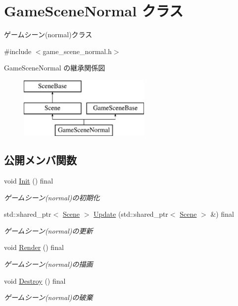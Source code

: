 \hypertarget{class_game_scene_normal}{}\section{Game\+Scene\+Normal クラス}
\label{class_game_scene_normal}


ゲームシーン(normal)クラス  




{\ttfamily \#include $<$game\+\_\+scene\+\_\+normal.\+h$>$}

Game\+Scene\+Normal の継承関係図\begin{figure}[H]
\begin{center}
\leavevmode
\includegraphics[height=3.000000cm]{class_game_scene_normal}
\end{center}
\end{figure}
\subsection*{公開メンバ関数}
\begin{DoxyCompactItemize}
\item 
void \mbox{\hyperlink{class_game_scene_normal_ac3f3e52cf1c24802035f38fccb221fd3}{Init}} () final
\begin{DoxyCompactList}\small\item\em ゲームシーン(normal)の初期化 \end{DoxyCompactList}\item 
std\+::shared\+\_\+ptr$<$ \mbox{\hyperlink{class_scene}{Scene}} $>$ \mbox{\hyperlink{class_game_scene_normal_a3e45ac3882f1d0dd5c77ab4f0a1ccb33}{Update}} (std\+::shared\+\_\+ptr$<$ \mbox{\hyperlink{class_scene}{Scene}} $>$ \&) final
\begin{DoxyCompactList}\small\item\em ゲームシーン(normal)の更新 \end{DoxyCompactList}\item 
void \mbox{\hyperlink{class_game_scene_normal_a1f0ef0b5b194f9f9e7bf857cca7acc39}{Render}} () final
\begin{DoxyCompactList}\small\item\em ゲームシーン(normal)の描画 \end{DoxyCompactList}\item 
void \mbox{\hyperlink{class_game_scene_normal_a1c06daa1715624eabd199472a37d97cd}{Destroy}} () final
\begin{DoxyCompactList}\small\item\em ゲームシーン(normal)の破棄 \end{DoxyCompactList}\end{DoxyCompactItemize}


